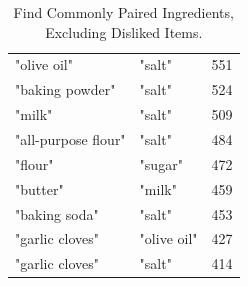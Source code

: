 \begin{enumerate}
\begin{table}[h!]
\begin{tabularx}{\textwidth}{>{\raggedright\arraybackslash}X>{\raggedright\arraybackslash}Xc}
"olive oil"         & "salt"              & 551  \\
"baking powder"     & "salt"              & 524  \\
"milk"              & "salt"              & 509  \\
"all-purpose flour" & "salt"              & 484  \\
"flour"             & "sugar"             & 472  \\
"butter"            & "milk"              & 459  \\
"baking soda"       & "salt"              & 453  \\
"garlic cloves"     & "olive oil"         & 427  \\
"garlic cloves"     & "salt"              & 414  \\

\bottomrule
\end{tabularx}
\caption{Find Commonly Paired Ingredients, Excluding Disliked Items.}
\label{tab:cooccurrence_data}
\end{table}


\end{enumerate}
